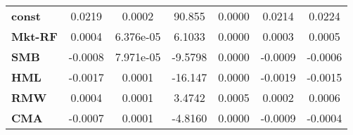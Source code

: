 \begin{center}
\begin{tabular}{lcccccc}
\midrule
\textbf{const}  &       0.0219       &       0.0002       &      90.855     &      0.0000      &       0.0214      &       0.0224       \\
\textbf{Mkt-RF} &       0.0004       &     6.376e-05      &      6.1033     &      0.0000      &       0.0003      &       0.0005       \\
\textbf{SMB}    &      -0.0008       &     7.971e-05      &     -9.5798     &      0.0000      &      -0.0009      &      -0.0006       \\
\textbf{HML}    &      -0.0017       &       0.0001       &     -16.147     &      0.0000      &      -0.0019      &      -0.0015       \\
\textbf{RMW}    &       0.0004       &       0.0001       &      3.4742     &      0.0005      &       0.0002      &       0.0006       \\
\textbf{CMA}    &      -0.0007       &       0.0001       &     -4.8160     &      0.0000      &      -0.0009      &      -0.0004       \\
\bottomrule
\end{tabular}
\end{center}
